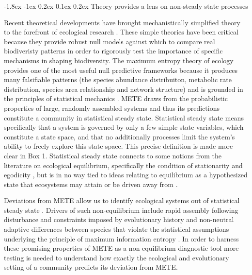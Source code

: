 \documentclass[11pt]{article}
\makeatletter
\renewcommand\subsection{\@startsection{subsection}{1}{\z@}%
                                  {-1.8ex \@plus -1ex \@minus 0.2ex}%
                                  {0.1ex \@plus 0.2ex}%
                                  {\normalfont\large\bfseries}}
\makeatother
\begin{document}
\subsection{Theory provides a lens on non-steady state processes}

Recent theoretical developments have brought mechanistically
simplified theory to the forefront of ecological research
\citep{hubbell2001, rosindell2011TREE, harte2011}.  These simple
theories have been critical because they provide robust null models
against which to compare real biodiveristy patterns in order to
rigorously test the importance of specific mechanisms in shaping
biodiversity.  The maximum entropy theory of ecology
\citep[METE;][]{harte2011} provides one of the most useful null
predictive frameworks because it produces many falsifiable patterns
(the species abundance distribuiton, metabolic rate distribution,
species area relationship and network structure) and is grounded in
the principles of statistical mechanics \citep{harte2011, Jaynes1957}.
METE draws from the probabilistic properties of large, randomly
assembled systems \citep{harte2011} and thus its predictions
constitute a community in statistical steady state.  Statistical
steady state means specifically that a system is governed by only a
few simple state variables, which constitute a state space, and that
no additionally processes limit the system’s ability to freely explore
this state space.  This precise definition is made more clear in Box
1.  Statistical steady state connects to some notions from the
literature on ecological equilibrium, specifically the condition of
stationarity and egodicity \citep{brian1999}, but is in no way tied
\citep{harte2011} to ideas relating to equilibrium as a hypothesized
state that ecosystems may attain or be driven away from
\citep[e.g. not:][]{levin1970, scholz1997, rabosky2009}.

Deviations from METE allow us to identify ecological systems out of
statistical steady state \citep{harte2011, rominger2015}.  Drivers of
such non-equilibrium include rapid assembly following disturbance
\citep{harte2011} and constraints imposed by evolutionary history and
non-neutral adaptive differences between species that violate the
statistical assumptions underlying the principle of maximum
information entropy \citep{rominger2015}.  In order to harness these
promising properties of METE as a non-equilibrium diagnostic tool more
testing is needed to understand how exactly the ecological and
evolutionary setting of a community predicts its deviation from METE.
\end{document}
